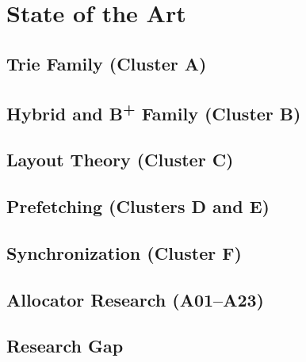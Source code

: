 \chapter{State of the Art}\label{ch:sota}


\section{Trie Family (Cluster A)}\label{sec:cluster-a}

\section{Hybrid and B\texorpdfstring{\textsuperscript{+}}{+} Family (Cluster B)}\label{sec:cluster-b}

\section{Layout Theory (Cluster C)}\label{sec:cluster-c}

\section{Prefetching (Clusters D and E)}\label{sec:cluster-de}

\section{Synchronization (Cluster F)}\label{sec:cluster-f}

\section{Allocator Research (A01--A23)}\label{sec:allocators}

\section{Research Gap}\label{sec:gap}
